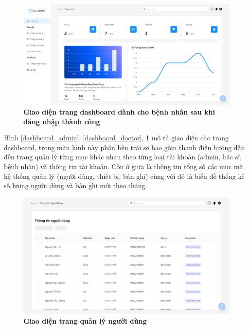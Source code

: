 \begin{figure}[H]
  \centering
  \includegraphics[scale=0.4]{Images/server/webUI/dashboard_patient.png}
  \caption[Giao diện trang dashboard dành cho bệnh nhân sau khi đăng nhập thành công]{\bfseries \fontsize{12pt}{0pt}\selectfont Giao diện trang dashboard dành cho bệnh nhân sau khi đăng nhập thành công}
  \label{dashboard_patient} %
\end{figure}

Hình \ref{dashboard_admin}, \ref{dashboard_doctor}, \ref{dashboard_patient} mô tả giao diện cho trang dashboard, trong màn hình này phần bên trái sẽ bao
 gồm thanh điều hướng dẫn đến trang quản lý từng mục khác nhau theo từng loại tài khoản (admin, bác sĩ, bệnh nhân) và 
 thông tin tài khoản. Còn ở giữa là thông tin tổng số các mục mà hệ thống quản lý (người dùng, thiết bị, bản ghi)
 cùng với đó là biểu đồ thống kê số lượng người dùng và bản ghi mới theo tháng.

\begin{figure}[H]
  \centering
  \includegraphics[scale=0.5]{Images/server/webUI/userTable.png}
  \caption[Giao diện trang quản lý người dùng]{\bfseries \fontsize{12pt}{0pt}\selectfont Giao diện trang quản lý người dùng}
  \label{userTable} %
\end{figure}


